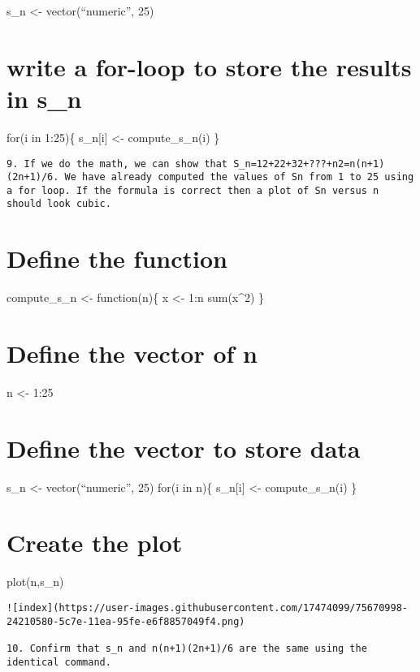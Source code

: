 \documentclass[
]{article}
\begin{document}
s\_n \textless- vector(``numeric'', 25)

\hypertarget{write-a-for-loop-to-store-the-results-in-s_n}{%
\section{write a for-loop to store the results in
s\_n}\label{write-a-for-loop-to-store-the-results-in-s_n}}

for(i in 1:25)\{ s\_n{[}i{]} \textless- compute\_s\_n(i) \}

\begin{verbatim}
9. If we do the math, we can show that S_n=12+22+32+???+n2=n(n+1)(2n+1)/6. We have already computed the values of Sn from 1 to 25 using a for loop. If the formula is correct then a plot of Sn versus n should look cubic.
\end{verbatim}

\hypertarget{define-the-function}{%
\section{Define the function}\label{define-the-function}}

compute\_s\_n \textless- function(n)\{ x \textless- 1:n sum(x\^{}2) \}

\hypertarget{define-the-vector-of-n}{%
\section{Define the vector of n}\label{define-the-vector-of-n}}

n \textless- 1:25

\hypertarget{define-the-vector-to-store-data}{%
\section{Define the vector to store
data}\label{define-the-vector-to-store-data}}

s\_n \textless- vector(``numeric'', 25) for(i in n)\{ s\_n{[}i{]}
\textless- compute\_s\_n(i) \}

\hypertarget{create-the-plot}{%
\section{Create the plot}\label{create-the-plot}}

plot(n,s\_n)

\begin{verbatim}
![index](https://user-images.githubusercontent.com/17474099/75670998-24210580-5c7e-11ea-95fe-e6f8857049f4.png)

10. Confirm that s_n and n(n+1)(2n+1)/6 are the same using the identical command.
\end{verbatim}
\end{document}
